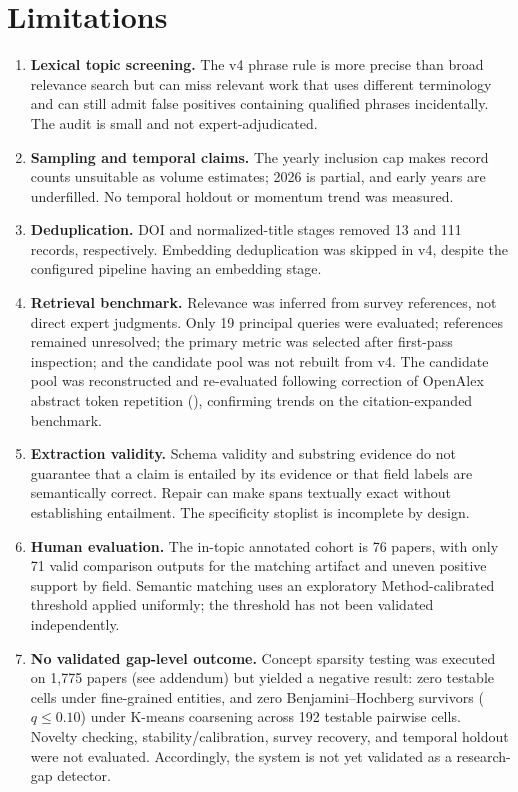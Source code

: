 \documentclass[sigconf,review,anonymous]{acmart}
\begin{document}
\section{Limitations}
\begin{enumerate}
\item \textbf{Lexical topic screening.} The v4 phrase rule is more precise than broad relevance search but can miss relevant work that uses different terminology and can still admit false positives containing qualified phrases incidentally. The audit is small and not expert-adjudicated.
\item \textbf{Sampling and temporal claims.} The yearly inclusion cap makes record counts unsuitable as volume estimates; 2026 is partial, and early years are underfilled. No temporal holdout or momentum trend was measured.
\item \textbf{Deduplication.} DOI and normalized-title stages removed 13 and 111 records, respectively. Embedding deduplication was skipped in v4, despite the configured pipeline having an embedding stage.
\item \textbf{Retrieval benchmark.} Relevance was inferred from survey references, not direct expert judgments. Only 19 principal queries were evaluated; references remained unresolved; the primary metric was selected after first-pass inspection; and the candidate pool was not rebuilt from v4. The candidate pool was reconstructed and re-evaluated following correction of OpenAlex abstract token repetition (\texttt{}), confirming trends on the citation-expanded benchmark.
\item \textbf{Extraction validity.} Schema validity and substring evidence do not guarantee that a claim is entailed by its evidence or that field labels are semantically correct. Repair can make spans textually exact without establishing entailment. The specificity stoplist is incomplete by design.
\item \textbf{Human evaluation.} The in-topic annotated cohort is 76 papers, with only 71 valid comparison outputs for the matching artifact and uneven positive support by field. Semantic matching uses an exploratory Method-calibrated threshold applied uniformly; the threshold has not been validated independently.
\item \textbf{No validated gap-level outcome.} Concept sparsity testing was executed on 1,775 papers (see addendum) but yielded a negative result: zero testable cells under fine-grained entities, and zero Benjamini–Hochberg survivors ($q \le 0.10$) under K-means coarsening across 192 testable pairwise cells. Novelty checking, stability/calibration, survey recovery, and temporal holdout were not evaluated. Accordingly, the system is not yet validated as a research-gap detector.
\end{enumerate}
\end{document}
